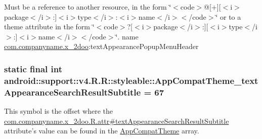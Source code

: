 Must be a reference to another resource, in the form \char`\"{}$<$code$>$@\mbox{[}+\mbox{]}\mbox{[}$<$i$>$package$<$/i$>$:\mbox{]}$<$i$>$type$<$/i$>$:$<$i$>$name$<$/i$>$$<$/code$>$\char`\"{} or to a theme attribute in the form \char`\"{}$<$code$>$?\mbox{[}$<$i$>$package$<$/i$>$:\mbox{]}\mbox{[}$<$i$>$type$<$/i$>$:\mbox{]}$<$i$>$name$<$/i$>$$<$/code$>$\char`\"{}.  name \hyperlink{namespacecom_1_1companyname_1_1x__2doo}{com.companyname.x\_\-2doo}:textAppearancePopupMenuHeader \hypertarget{classandroid_1_1support_1_1v4_1_1_r_1_1styleable_62807726d61e458ec15ee48dbbc82a3e}{
\subsubsection[{AppCompatTheme\_\-textAppearanceSearchResultSubtitle}]{\setlength{\rightskip}{0pt plus 5cm}static final int android::support::v4.R.R::styleable::AppCompatTheme\_\-textAppearanceSearchResultSubtitle = 67}}
\label{classandroid_1_1support_1_1v4_1_1_r_1_1styleable_62807726d61e458ec15ee48dbbc82a3e}


This symbol is the offset where the \hyperlink{classcom_1_1companyname_1_1x__2doo_1_1_r_1_1attr_e83b534544c711b33a468c31d932cbba}{com.companyname.x\_\-2doo.R.attr\#textAppearanceSearchResultSubtitle} attribute's value can be found in the \hyperlink{classandroid_1_1support_1_1v4_1_1_r_1_1styleable_0873e92ba21076bb5a4aeadeb7f5779f}{AppCompatTheme} array.

